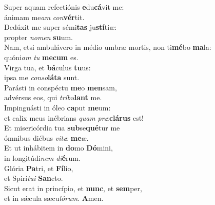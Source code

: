 \evenverse Super aquam refectiónis \textbf{e}du\textbf{cá}vit me:~\*\\
\evenverse ánimam me\textit{am} \textit{con}\textbf{vér}tit.\\
\oddverse Dedúxit me super sémi\textbf{tas} ju\textbf{stí}tiæ:~\*\\
\oddverse propter \textit{no}\textit{men} \textbf{su}um.\\
\evenverse Nam, etsi ambulávero in médio umbræ mortis, non ti\textbf{mé}bo \textbf{ma}la:~\*\\
\evenverse quóni\textit{am} \textit{tu} \textbf{me}\textbf{cum} es.\\
\oddverse Virga tua, et \textbf{bá}culus \textbf{tu}us:~\*\\
\oddverse ipsa me \textit{con}\textit{so}\textbf{lá}\textbf{ta} sunt.\\
\evenverse Parásti in conspéctu \textbf{me}o \textbf{men}sam,~\*\\
\evenverse advérsus eos, qui \textit{trí}\textit{bu}\textbf{lant} me.\\
\oddverse Impinguásti in óleo \textbf{ca}put \textbf{me}um:~\*\\
\oddverse et calix meus inébrians \textit{quam} \textit{præ}\textbf{clá}\textbf{rus} est!\\
\evenverse Et misericórdia tua \textbf{sub}se\textbf{qué}tur me~\*\\
\evenverse ómnibus diébus \textit{vi}\textit{tæ} \textbf{me}æ.\\
\oddverse Et ut inhábitem in \textbf{do}mo \textbf{Dó}mini,~\*\\
\oddverse in longitúdi\textit{nem} \textit{di}\textbf{é}rum.\\
\evenverse Glória \textbf{Pa}tri, et \textbf{Fí}lio,~\*\\
\evenverse et Spirí\textit{tu}\textit{i} \textbf{San}cto.\\
\oddverse Sicut erat in princípio, et \textbf{nunc}, et \textbf{sem}per,~\*\\
\oddverse et in sǽcula sæcu\textit{ló}\textit{rum}. \textbf{A}men.\\
